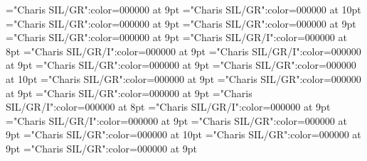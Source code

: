 \documentclass[gps1,twoside]{article}
\begin{document}
\font\spantexitemteLexSensepublishStemGlossPubLdtesensesensesentryletDatadicBody="Charis SIL/GR":color=000000 at 9pt
\font\xitemhiLexSensepublishStemGlossPubLdtesensesensesentryletDatadicBody="Charis SIL/GR":color=000000 at 10pt
\font\spanhixitemhiLexSensepublishStemGlossPubLdtesensesensesentryletDatadicBody="Charis SIL/GR":color=000000 at 9pt
\font\examplessensesensesentryletDatadicBody="Charis SIL/GR":color=000000 at 9pt
\font\xitemexamplessensesensesentryletDatadicBody="Charis SIL/GR":color=000000 at 9pt
\font\exampleggoTeluINxitemexamplessensesensesentryletDatadicBody="Charis SIL/GR/I":color=000000 at 8pt
\font\spanggoTeluINexampleggoTeluINxitemexamplessensesensesentryletDatadicBody="Charis SIL/GR/I":color=000000 at 9pt
\font\spanenexampleggoTeluINxitemexamplessensesensesentryletDatadicBody="Charis SIL/GR/I":color=000000 at 9pt
\font\translationsxitemexamplessensesensesentryletDatadicBody="Charis SIL/GR":color=000000 at 9pt
\font\translationLdtetranslationsxitemexamplessensesensesentryletDatadicBody="Charis SIL/GR":color=000000 at 10pt
\font\spantetranslationLdtetranslationsxitemexamplessensesensesentryletDatadicBody="Charis SIL/GR":color=000000 at 9pt
\font\spanentranslationLdtetranslationsxitemexamplessensesensesentryletDatadicBody="Charis SIL/GR":color=000000 at 9pt
\font\spanenexamplessensesensesentryletDatadicBody="Charis SIL/GR":color=000000 at 9pt
\font\exampleggoTeluINexamplessensesensesentryletDatadicBody="Charis SIL/GR/I":color=000000 at 8pt
\font\spanggoTeluINexampleggoTeluINexamplessensesensesentryletDatadicBody="Charis SIL/GR/I":color=000000 at 9pt
\font\spanenexampleggoTeluINexamplessensesensesentryletDatadicBody="Charis SIL/GR/I":color=000000 at 9pt
\font\translationsexamplessensesensesentryletDatadicBody="Charis SIL/GR":color=000000 at 9pt
\font\translationLdtetranslationsexamplessensesensesentryletDatadicBody="Charis SIL/GR":color=000000 at 10pt
\font\spantetranslationLdtetranslationsexamplessensesensesentryletDatadicBody="Charis SIL/GR":color=000000 at 9pt
\font\spanentranslationLdtetranslationsexamplessensesensesentryletDatadicBody="Charis SIL/GR":color=000000 at 9pt
\end{document}
